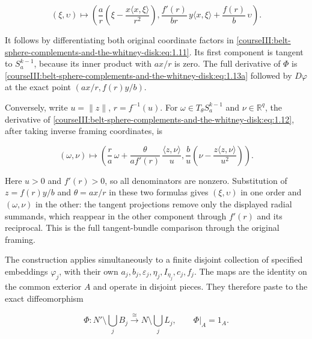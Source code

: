 \begin{equation}
(\xi,\upsilon)\longmapsto
\left(
\frac a r\left(\xi-\frac{x\langle x,\xi\rangle}{r^2}\right),
\frac{f'(r)}{br}\,y\langle x,\xi\rangle
+\frac{f(r)}b\,\upsilon
\right).
\label{courseIII:belt-sphere-complements-and-the-whitney-disk:eq:1.13a}
\end{equation}

It follows by differentiating both original coordinate factors in \eqref{courseIII:belt-sphere-complements-and-the-whitney-disk:eq:1.11}. Its first component is tangent to \(S_a^{k-1}\), because its inner product with \(ax/r\) is zero. The full derivative of \(\Phi\) is \eqref{courseIII:belt-sphere-complements-and-the-whitney-disk:eq:1.13a} followed by \(D\varphi\) at the exact point \((ax/r,f(r)y/b)\).

Conversely, write \(u=\|z\|\), \(r=f^{-1}(u)\). For \(\omega\in T_\theta S_a^{k-1}\) and \(\nu\in\mathbb R^q\), the derivative of \eqref{courseIII:belt-sphere-complements-and-the-whitney-disk:eq:1.12}, after taking inverse framing coordinates, is

\begin{equation}
(\omega,\nu)\longmapsto
\left(
\frac r a\,\omega+
\frac{\theta}{a f'(r)}\,\frac{\langle z,\nu\rangle}{u},
\frac b u\left(\nu-\frac{z\langle z,\nu\rangle}{u^2}\right)
\right).
\label{courseIII:belt-sphere-complements-and-the-whitney-disk:eq:1.13b}
\end{equation}

Here \(u>0\) and \(f'(r)>0\), so all denominators are nonzero. Substitution of \(z=f(r)y/b\) and \(\theta=ax/r\) in these two formulas gives \((\xi,\upsilon)\) in one order and \((\omega,\nu)\) in the other: the tangent projections remove only the displayed radial summands, which reappear in the other component through \(f'(r)\) and its reciprocal. This is the full tangent-bundle comparison through the original framing.

The construction applies simultaneously to a finite disjoint collection of specified embeddings \(\varphi_j\), with their own \(a_j,b_j,\varepsilon_j,\eta_j,I_{\eta_j},c_j,f_j\). The maps are the identity on the common exterior \(A\) and operate in disjoint pieces. They therefore paste to the exact diffeomorphism

\begin{equation}
\Phi:
N'\setminus\bigcup_j B_j
\xrightarrow{\ \cong\ }
N\setminus\bigcup_j L_j,
\qquad \Phi|_A=1_A.
\label{courseIII:belt-sphere-complements-and-the-whitney-disk:eq:1.14}
\end{equation}

